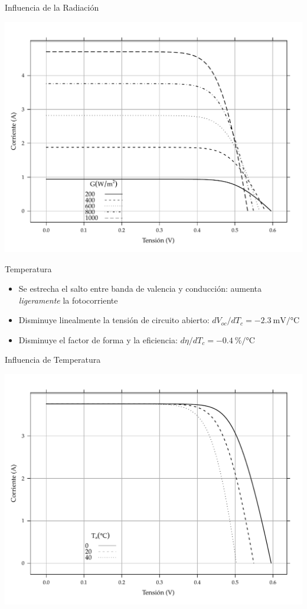 \documentclass[xcolor={usenames,svgnames,dvipsnames}]{beamer}
\begin{document}
\begin{frame}[label={sec:org549ee7a}]{Influencia de la Radiación}
\begin{center}
\includegraphics[width=.9\linewidth]{../figs/CurvaIV_Ta20.pdf}
\end{center}
\end{frame}

\begin{frame}[label={sec:org90fe543}]{Temperatura}
\begin{itemize}
\item Se estrecha el salto entre banda de valencia y conducción: aumenta \emph{ligeramente} la fotocorriente

\item \alert{Disminuye linealmente la tensión de circuito abierto}: \(dV_{oc}/dT_{c}=\SI{-2.3}{\milli\volt\per\celsius}\)

\item Disminuye el factor de forma y la eficiencia:
\(d\eta/dT_{c}=\SI{-0.4}{\percent\per\celsius}\)
\end{itemize}
\end{frame}

\begin{frame}[label={sec:org1f68d89}]{Influencia de Temperatura}
\begin{center}
\includegraphics[width=.9\linewidth]{../figs/CurvaIV_G800.pdf}
\end{center}
\end{frame}
\end{document}
